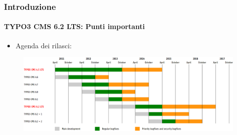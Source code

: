 
\begin{frame}[fragile]
	\frametitle{Introduzione}
	\framesubtitle{TYPO3 CMS 6.2 LTS: Punti importanti}

	\begin{itemize}
		\item Agenda dei rilasci:
	\end{itemize}

	\begin{figure}
		\includegraphics[width=0.99\linewidth]{Images/Introduction/ReleaseAgenda.png}
	\end{figure}

\end{frame}


